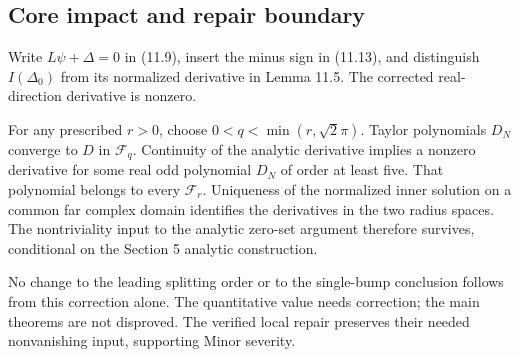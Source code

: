 \documentclass[10pt]{article}
\begin{document}
\subsection*{Core impact and repair boundary}
Write \(L\psi+\Delta=0\) in (11.9), insert the minus sign in (11.13), and distinguish \(I(\Delta_0)\) from its normalized derivative in Lemma 11.5. The corrected real-direction derivative is nonzero.\par
For any prescribed \(r>0\), choose \(0<q<\min(r,\sqrt2\pi)\). Taylor polynomials \(D_N\) converge to \(D\) in \(\mathcal F_q\). Continuity of the analytic derivative implies a nonzero derivative for some real odd polynomial \(D_N\) of order at least five. That polynomial belongs to every \(\mathcal F_r\). Uniqueness of the normalized inner solution on a common far complex domain identifies the derivatives in the two radius spaces. The nontriviality input to the analytic zero-set argument therefore survives, conditional on the Section 5 analytic construction.\par
No change to the leading splitting order or to the single-bump conclusion follows from this correction alone. The quantitative value needs correction; the main theorems are not disproved. The verified local repair preserves their needed nonvanishing input, supporting Minor severity.\par
\end{document}

